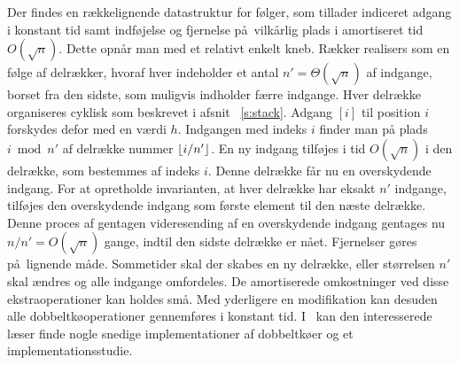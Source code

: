 Der findes en rækkelignende datastruktur for følger, som tillader indiceret adgang i konstant tid samt indføjelse og fjernelse på vilkårlig plads i amortiseret tid
$O(\sqrt{n})$.
Dette opnår man med et relativt enkelt kneb.
Rækker realisers som en følge af delrækker, hvoraf hver indeholder et antal
$n'=\Theta(\sqrt{n})$ af indgange, borset fra den sidste, som muligvis indholder færre indgange.  
Hver delrække organiseres cyklisk som beskrevet i afsnit ~\ref{s:stack}.
Adgang $[i]$ til position $i$ forskydes defor med en værdi $h$.
Indgangen med indeks $i$ finder man på plads $i\bmod n'$ af delrække nummer $\lfloor i/n'\rfloor$. 
En ny indgang tilføjes i tid $O(\sqrt{n})$ i den delrække, som bestemmes af indeks $i$.
Denne delrække får nu en overskydende indgang.
For at opretholde invarianten, at hver delrække har eksakt $n'$ indgange, tilføjes den overskydende indgang som første element til den næste delrække.
Denne proces af gentagen videresending af en overskydende indgang gentages nu
$n/n'= O(\sqrt{n})$ gange, indtil den sidste delrække er nået.
Fjernelser gøres på lignende måde.
Sommetider skal der skabes en ny delrække, eller størrelsen $n'$ skal ændres og alle indgange omfordeles.
De amortiserede omkostninger ved disse ekstraoperationer kan holdes små.
Med yderligere en modifikation kan desuden alle dobbeltkøoperationer gennemføres i konstant tid.
I~\cite{MorKat01} kan den interesserede læser finde nogle snedige implementationer af dobbeltkøer og et implementationsstudie.


